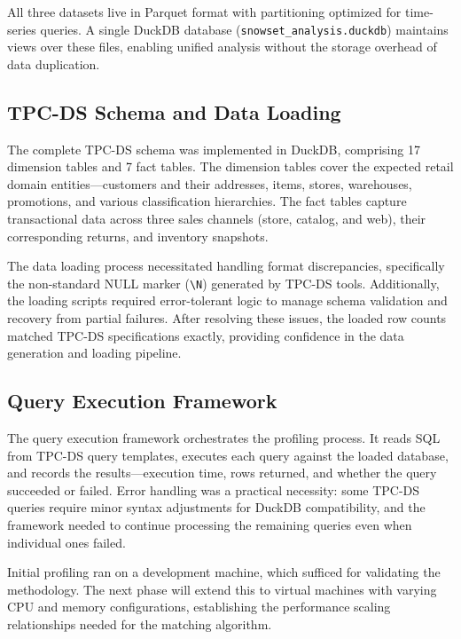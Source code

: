 \documentclass[12pt]{report}
\begin{document}
All three datasets live in Parquet format with partitioning optimized for time-series queries. A single DuckDB database (\texttt{snowset\_analysis.duckdb}) maintains views over these files, enabling unified analysis without the storage overhead of data duplication.

\subsection{TPC-DS Schema and Data Loading}
\label{subsec:tpcds-loading}

The complete TPC-DS schema was implemented in DuckDB, comprising 17 dimension tables and 7 fact tables. The dimension tables cover the expected retail domain entities---customers and their addresses, items, stores, warehouses, promotions, and various classification hierarchies. The fact tables capture transactional data across three sales channels (store, catalog, and web), their corresponding returns, and inventory snapshots.

The data loading process necessitated handling format discrepancies, specifically the non-standard NULL marker (\texttt{\textbackslash N}) generated by TPC-DS tools. Additionally, the loading scripts required error-tolerant logic to manage schema validation and recovery from partial failures. After resolving these issues, the loaded row counts matched TPC-DS specifications exactly, providing confidence in the data generation and loading pipeline.

\subsection{Query Execution Framework}
\label{subsec:execution-framework}

The query execution framework orchestrates the profiling process. It reads SQL from TPC-DS query templates, executes each query against the loaded database, and records the results---execution time, rows returned, and whether the query succeeded or failed. Error handling was a practical necessity: some TPC-DS queries require minor syntax adjustments for DuckDB compatibility, and the framework needed to continue processing the remaining queries even when individual ones failed.

Initial profiling ran on a development machine, which sufficed for validating the methodology. The next phase will extend this to virtual machines with varying CPU and memory configurations, establishing the performance scaling relationships needed for the matching algorithm.
\end{document}

